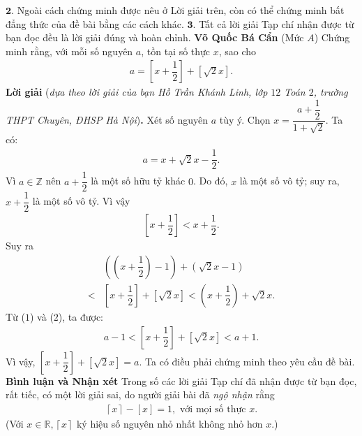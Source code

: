 \begin{multicols}{2}
	\vskip 0.05cm
	$\pmb{2.}$ Ngoài cách chứng minh được nêu ở Lời giải trên, còn có thể chứng minh bất đẳng thức của đề bài bằng các cách khác.
	\vskip 0.05cm
	$\pmb{3.}$ Tất cả lời giải Tạp chí nhận được từ bạn đọc đều là lời giải đúng và hoàn chỉnh.
	\vskip 0.15cm
	\hfill	\textbf{\color{thachthuctoanhoc}Võ Quốc Bá Cẩn}
	\vskip 0.15cm
	{}
	(Mức $A$) Chứng minh rằng, với mỗi số nguyên $a$, tồn tại số thực $x$, sao cho  
	\begin{align*}
		a=\left[ x +\dfrac12\right]+\left[\sqrt{2}x\right].
	\end{align*}
	\textbf{\color{thachthuctoanhoc}Lời giải} (\textit{dựa theo lời giải của bạn Hồ Trần Khánh Linh, lớp $12$ Toán $2$, trường THPT Chuyên, ĐHSP Hà Nội})\textbf{\color{thachthuctoanhoc}.}
	\vskip 0.05cm
	Xét số nguyên $a$ tùy ý. Chọn $x = \dfrac{{a + \dfrac{1}{2}}}{{1 + \sqrt 2 }}.$  Ta có:
	\begin{align*}
		a = x + \sqrt 2 x - \dfrac{1}{2}. \tag{$1$}
	\end{align*}
	Vì $a \in \mathbb{Z}$  nên $a + \dfrac{1}{2}$ là một số hữu tỷ khác $0$. Do đó, $x$ là một số vô tỷ; suy ra, $x + \dfrac{1}{2}$ là một số vô tỷ. Vì vậy
	\begin{align*}
		\left[ {x + \dfrac{1}{2}} \right] < x + \dfrac{1}{2}.
	\end{align*}
	Suy ra
	\begin{align*}
		&\left( {\left( {x + \dfrac{1}{2}} \right) - 1} \right) + \left( {\sqrt 2 x - 1} \right) \\
		< &\left[ {x \!+\! \dfrac{1}{2}} \right] \!+\! \left[ {\sqrt 2 x} \right] \!<\! \left( {x \!+\! \dfrac{1}{2}} \right) \!+\! \sqrt 2 x. \tag{$2$}
	\end{align*}
	Từ ($1$) và ($2$), ta được:
	\begin{align*}
		a - 1 < \left[ {x + \dfrac{1}{2}} \right] + \left[ {\sqrt 2 x} \right] < a + 1.
	\end{align*}
	Vì vậy, $\left[ {x + \dfrac{1}{2}} \right] + \left[ {\sqrt 2 x} \right] = a$.
	\vskip 0.05cm   
	Ta có điều phải chứng minh theo yêu cầu đề bài.
	\vskip 0.05cm
	\textbf{\color{thachthuctoanhoc}Bình luận và Nhận xét}
	\vskip 0.05cm
	Trong số các lời giải Tạp chí đã nhận được từ bạn đọc, rất tiếc, có một lời giải sai, do người giải bài đã \textit{ngộ nhận} rằng
	\begin{align*}
		 \left\lceil x \right\rceil  - \left[ x \right] = 1, \text{ với mọi số thực } x.
	\end{align*}
	(Với $x \in \mathbb{R}, \left\lceil x \right\rceil $    ký hiệu số nguyên nhỏ nhất không nhỏ hơn $x$.)

\end{multicols}
